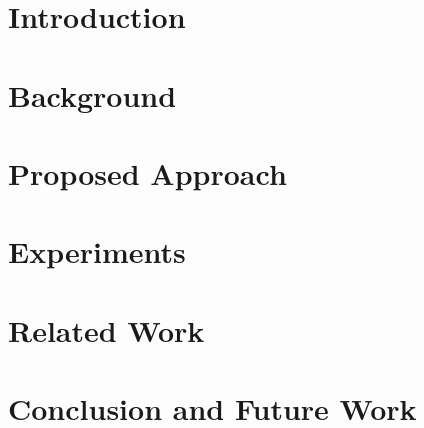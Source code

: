 
\section{Introduction}\label{sec.intro}


\section{Background}\label{sec.prelim}


\section{Proposed Approach}\label{sec.approach}


\section{Experiments }\label{sec.exp}


\section{Related Work}\label{sec.related}


\section{Conclusion and Future Work} \label{sec.conclusion}


% 